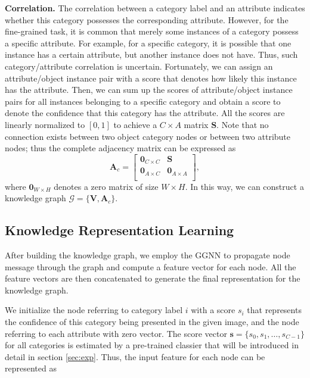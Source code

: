 \documentclass{article}
\begin{document}
\noindent\textbf{Correlation. }The correlation between a category label and an attribute indicates whether this category possesses the corresponding attribute. However, for the fine-grained task, it is common that merely some instances of a category possess a specific attribute. For example, for a specific category, it is possible that one instance has a certain attribute, but another instance does not have. Thus, such category/attribute correlation is uncertain. Fortunately, we can assign an attribute/object instance pair with a score that denotes how likely this instance has the attribute. Then, we can sum up the scores of attribute/object instance pairs for all instances belonging to a specific category and obtain a score to denote the confidence that this category has the attribute. All the scores are linearly normalized to $[0, 1]$ to achieve a $C \times A$ matrix $\mathbf{S}$. Note that no connection exists between two object category nodes or between two attribute nodes; thus the complete adjacency matrix can be expressed as 
\begin{equation}
\mathbf{A}_c=   \left[\begin{matrix} %
      \mathbf{0}_{C \times C} & \mathbf{S} \\
      \mathbf{0}_{A \times C} &  \mathbf{0}_{A \times A} \\
   \end{matrix}\right],
\end{equation}
where $\mathbf{0}_{W \times H}$ denotes a zero matrix of size $W \times H$. In this way, we can construct a knowledge graph $\mathcal{G}=\{\mathbf{V}, \mathbf{A}_c\}$. 

\subsection{Knowledge Representation Learning}
After building the knowledge graph, we employ the GGNN to propagate node message through the graph and compute a feature vector for each node. All the feature vectors are then concatenated to generate the final representation for the knowledge graph. 

We initialize the node referring to category label $i$ with a score $s_i$ that represents the confidence of this category being presented in the given image, and the node referring to each attribute with zero vector. The score vector $\mathbf{s}=\{s_0, s_1, \dots, s_{C-1}\}$ for all categories is estimated by a pre-trained classier that will be introduced in detail in section \ref{sec:exp}. Thus, the input feature for each node can be represented as
\end{document}
